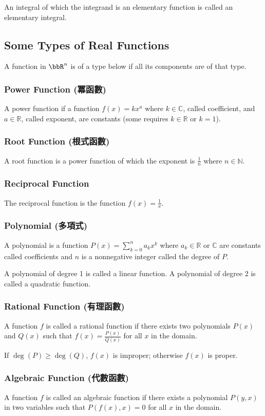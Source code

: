 \documentclass[a4paper,12pt]{report}
\begin{document}
An integral of which the integrand is an elementary function is called an elementary integral.
\subsection{Some Types of Real Functions}
A function in $\bbR^n$ is of a type below if all its components are of that type.
\subsubsection{Power Function (冪函數)}
A power function if a function $f(x)=kx^a$ where $k\in\mathbb{C}$, called coefficient, and $a\in\mathbb{R}$, called exponent, are constants (some requires $k\in\mathbb{R}$ or $k=1$).
\subsubsection{Root Function (根式函數)}
A root function is a power function of which the exponent is $\frac{1}{n}$ where $n\in\mathbb{N}$.
\subsubsection{Reciprocal Function}
The reciprocal function is the function $f(x)=\frac{1}{x}$.
\subsubsection{Polynomial (多項式)}
A polynomial is a function $P(x)=\sum_{k=0}^na_kx^k$ where $a_k\in\mathbb{R}$ or $\mathbb{C}$ are constants called coefficients and $n$ is a nonnegative integer called the degree of $P$.

A polynomial of degree 1 is called a linear function. A polynomial of degree 2 is called a quadratic function.
\subsubsection{Rational Function (有理函數)}
A function $f$ is called a rational function if there exists two polynomials $P(x)$ and $Q(x)$ such that $f(x)=\frac{P(x)}{Q(x)}$ for all $x$ in the domain.

If $\deg(P)\geq\deg(Q)$, $f(x)$ is improper; otherwise $f(x)$ is proper.
\subsubsection{Algebraic Function (代數函數)}
A function $f$ is called an algebraic function if there exists a polynomial $P(y,x)$ in two variables such that $P(f(x),x)=0$ for all $x$ in the domain.
\end{document}
